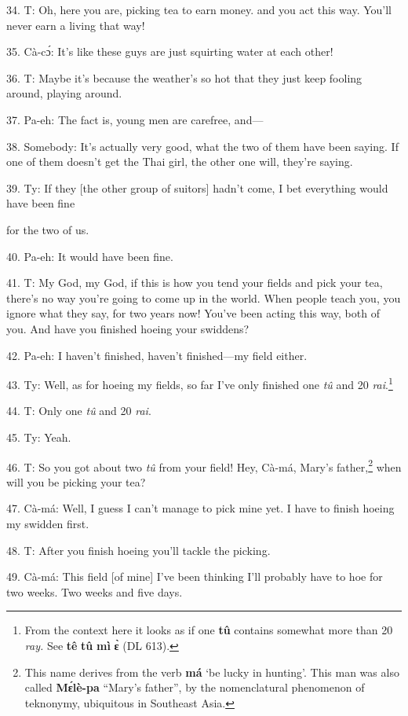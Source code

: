 34. T: Oh, here you are, picking tea to earn money. and you act this way. You'll
never earn a living that way!

35. Cà-cɔ́: It's like these guys are just squirting water at each other!

36. T: Maybe it's because the weather's so hot that they just keep fooling around,
playing around.

37. Pa-eh: The fact is, young men are carefree, and---

38. Somebody: It's actually very good, what the two of them have been saying.
If one of them doesn't get the Thai girl, the other one will, they're saying.

39. Ty: If they [the other group of suitors] hadn't come, I bet everything would
have been fine

for the two of us.

40. Pa-eh: It would have been fine.

41. T: My God, my God, if this is how you tend your fields and pick your tea,
there's no way you're going to come up in the world. When people teach you, you
ignore what they say, for two years now! You've been acting this way, both of
you. And have you finished hoeing your swiddens?

42. Pa-eh: I haven't finished, haven't finished---my field either.

43. Ty: Well, as for hoeing my fields, so far I've only finished one \textit{tû}
and 20 \textit{rai}.\footnote{From the context here it looks as if one \textbf{tû} contains somewhat more than 20 \textit{ray. }See \textbf{tê} \textbf{tû} \textbf{mì} \textbf{ɛ̀} (DL 613).}

44. T: Only one \textit{tû} and 20 \textit{rai}.

45. Ty: Yeah.

46. T: So you got about two \textit{tû }from your field! Hey, Cà-má, Mary's
father,\footnote{This name derives from the verb \textbf{má} `be lucky in hunting'. This man was also called \textbf{Mɛ́lè-pa} ``Mary's father'', by the nomenclatural phenomenon of teknonymy, ubiquitous in Southeast Asia.} when will you be picking your tea?

47. Cà-má: Well, I guess I can't manage to pick mine yet. I have to finish hoeing
my swidden first.

48. T: After you finish hoeing you'll tackle the picking.

49. Cà-má: This field [of mine] I've been thinking I'll probably have to hoe
for two weeks. Two weeks and five days.

